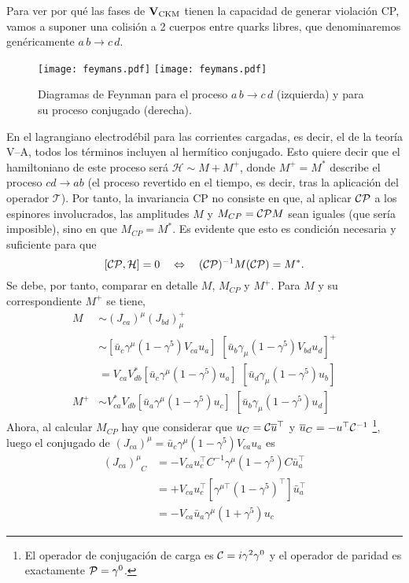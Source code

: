 \begin{subappendices}
Para ver por qué las fases de $\mathbf{V}_{\text{CKM}}$ tienen la capacidad de generar violación CP, vamos a suponer una colisión a 2 cuerpos entre quarks libres, que denominaremos genéricamente $a\,b \rightarrow c\,d$.
\begin{figure}[H]
\centering
\texttt{[image: feymans.pdf]}
\hspace*{3cm}
\texttt{[image: feymans.pdf]}
\caption{Diagramas de Feynman para el proceso $a\,b \rightarrow c\,d$ (izquierda) y para su proceso conjugado (derecha).}	
\end{figure}
%
En el lagrangiano electrodébil para las corrientes cargadas, es decir, el de la teoría V--A,
todos los términos incluyen al hermítico conjugado. Esto quiere decir que el hamiltoniano de este proceso será $\mathcal{H} \sim M + M^+$, donde $M^+ = M^*$ describe el proceso $cd \rightarrow ab$ (el proceso revertido en el tiempo, es decir, tras la aplicación del operador $\mathcal{T}$). Por tanto, la invariancia CP no consiste en que, al aplicar $\mathcal{CP}$ a los espinores involucrados, las amplitudes $M$ y $M_{CP} = \mathcal{CP} M$ sean iguales (que sería imposible), sino en que $M_{CP} = M^*$. Es evidente que esto es condición necesaria y suficiente para que 
\[[\mathcal{CP},\mathcal{H}] = 0 \quad  \Leftrightarrow \quad  (\mathcal{CP})^{-1} M (\mathcal{CP}) = M^*  .\]
Se debe, por tanto, comparar en detalle $M$, $M_{CP}$ y $M^+$. Para $M$ y su correspondiente $M^+$ se tiene,
\begin{align*}
M & \sim (J_{ca})^{\mu} (J_{bd})_{\mu}^+ \\ & \sim [\bar u_c \gamma^{\mu} (1-\gamma^5) V_{ca} u_a ] \,\, [\bar u_b \gamma_{\mu} (1 -\gamma^5) V_{bd} u_d]^+	\\ & = V_{ca} V_{db}^* [\bar u_c \gamma^{\mu} (1-\gamma^5)  u_a ] \,\, [\bar u_d \gamma_{\mu} (1 -\gamma^5) u_b] \\ M^+ & \sim V_{ca}^* V_{db}[\bar u_a \gamma^{\mu} (1-\gamma^5)  u_c ] \,\, [\bar u_b \gamma_{\mu} (1 -\gamma^5) u_d]
\end{align*}
%
Ahora, al calcular $M_{CP}$ hay que considerar que $u_C = \mathcal{C} \overline{u} ^{\top}$ y $\overline{u}_C = - u^{\top} \mathcal{C}^{-1}$ \footnote{El operador de conjugación de carga es $\mathcal{C} = i \gamma^2 \gamma^0$ y el operador  de paridad es exactamente $\mathcal{P} = \gamma^0$.},
luego el conjugado de $ (J_{ca})^{\mu} = \bar u_c \gamma^{\mu} (1-\gamma^5) V_{ca} u_a$ es
\begin{align*}
(J_{ca})_{\phantom{\mu} C}^{\mu} &= -V_{ca} u_c^{\top} C^{-1} \gamma^{\mu} (1-\gamma^5) C \bar{u}_a^{\top}\\ & = + V_{ca} u_c^{\top} [\gamma^{\mu \top} (1- \gamma^5)^{\top}] \bar{u}_a^{\top} \\ &= - V_{ca} \bar{u}_a \gamma^{\mu } (1+ \gamma^5) u_c	

\end{align*}
\end{subappendices}
